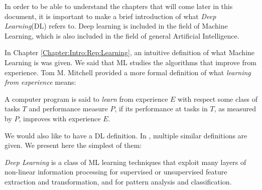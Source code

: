 \label{Chapter:Introduction:DL}

In order to be able to understand the chapters that will come later in this document, it is important to make a brief introduction of what \emph{Deep Learning}(DL) refers to. Deep learning is included in the field of Machine Learning, which is also included in the field of general Artificial Intelligence.

In Chapter \ref{Chapter:Intro:Rep:Learning}, an intuitive definition of what Machine Learning is was given. We said that ML studies the algorithms that improve from experience. Tom M. Mitchell \citep{mitchell_machine_1997} provided a more formal definition of what \emph{learning from experience} means:

\begin{ndefC}
A computer program is said to \emph{learn} from experience $E$ with respect some class of tasks $T$ and performance measure $P$, if its performance at tasks in $T$, as measured by $P$, improves with experience $E$.
\end{ndefC}

We would also like to have a DL definition. In \cite{deng_deep_2014}, multiple similar definitions are given. We present here the simplest of them:

\begin{ndefC}
\emph{Deep Learning} is a class of ML learning techniques that exploit many layers of non-linear information processing for supervised or unsupervised feature extraction and transformation, and for pattern analysis and classification.
\end{ndefC}

